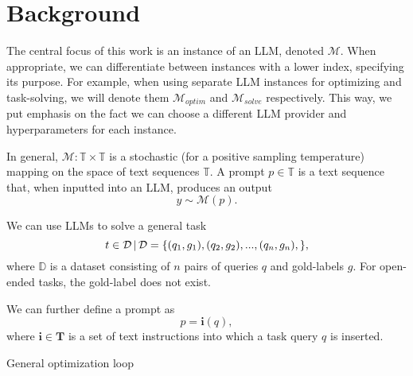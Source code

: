 \section{Background}\label{sec:notation}
The central focus of this work is an instance of an LLM, denoted $\mathcal{M}$. 
When appropriate, we can differentiate between instances with a lower index, specifying its purpose. 
For example, when using separate LLM instances for optimizing and task-solving, we will denote them $\mathcal{M}_{optim}$ and $\mathcal{M}_{solve}$ respectively.
This way, we put emphasis on the fact we can choose a different LLM provider and hyperparameters for each instance.


In general, $\mathcal{M}: \mathbb{T} \times \mathbb{T}$ is a stochastic (for a positive sampling temperature) mapping on the space of text sequences $\mathbb{T}$.
A prompt $p \in \mathbb{T}$ is a text sequence that, when inputted into an LLM, produces an output
\begin{equation}
    y \sim \mathcal{M}(p).
\end{equation} 

We can use LLMs to solve a general task
\begin{equation}
    t \in \mathcal{D} \, \vert \, \mathcal{D} = \{ (q_1, g_1), (q_2, g_2), ... , (q_n, g_n), \},
\end{equation}
where $\mathbb{D}$ is a dataset consisting of $n$ pairs of queries $q$ and gold-labels $g$. 
For open-ended tasks, the gold-label does not exist.


We can further define a prompt as
\begin{equation}
    p = \mathbf{i}(q),
\end{equation}
where $\mathbf{i} \in \mathbf{T}$ is a set of text instructions into which a task query $q$ is inserted. 

\begin{algorithm}
    \caption{General optimization loop}
    \label{alg:genoptimloop}
     
         
    \end{algorithm}
    

